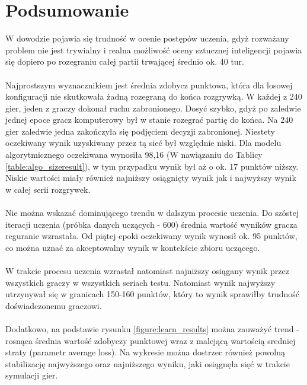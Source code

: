 \documentclass[12pt, oneside]{report}
\begin{document}
\section{Podsumowanie}
W dowodzie pojawia się trudność w ocenie postępów uczenia, gdyż rozważany problem nie jest trywialny i realna możliwość oceny sztucznej inteligencji pojawia się dopiero po rozegraniu całej partii trwającej średnio ok. 40 tur. \\ \\
Najprostszym wyznacznikiem jest średnia zdobycz punktowa, która dla losowej konfiguracji nie skutkowała żadną rozegraną do końca rozgrywką. W każdej z 240 gier, jeden z graczy dokonał ruchu zabronionego. Dosyć szybko, gdyż po zaledwie jednej epoce gracz komputerowy był w stanie rozegrać partię do końca. Na 240 gier zaledwie jedna zakończyła się podjęciem decyzji zabronionej. Niestety oczekiwany wynik uzyskiwany przez tą sieć był względnie niski. Dla modelu algorytmicznego oczekiwana wynosiła 98,16 (W nawiązaniu do Tablicy \ref{table:algo_sizeresult}), w tym przypadku wynik był aż o ok. 17 punktów niższy. Niskie wartości miały również najniższy osiągnięty wynik jak i najwyższy wynik w całej serii rozgrywek. \\ \\
Nie można wskazać dominującego trendu w dalszym procesie uczenia. Do szóstej iteracji uczenia (próbka danych uczących - 600) średnia wartość wyników gracza reguranie wzrastała. Od piątej epoki oczekiwany wynik wynosił ok. 95 punktów, co można uznać za akceptowalny wynik w kontekście zbioru uczącego. \\ \\ W trakcie procesu uczenia wzrastał natomiast najniższy osiągany wynik przez wszystkich graczy w wszystkich seriach testu. Natomiast wynik najwyższy utrzynywał się w granicach 150-160 punktów, który to wynik sprawiłby trudność doświadczonemu graczowi. \\ \\
Dodatkowo, na podstawie rysunku \ref{figure:learn_results} można zauważyć trend - rosnąca średnia wartość zdobyczy punktowej wraz z malejącą wartością sredniej straty (parametr average loss). Na wykresie można dostrzec również powolną stabilizację najwyższego oraz najniższego wyniku, jaki osiągnęła sięć w trakcie symulacji gier.
\end{document}
